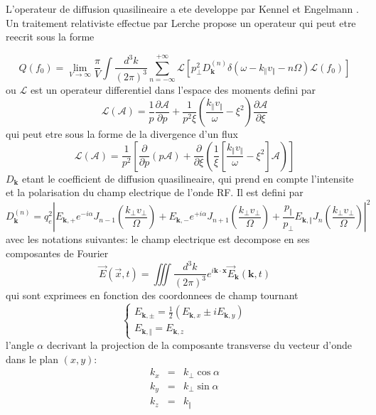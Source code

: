 L'operateur de diffusion quasilineaire a ete developpe par Kennel
et Engelmann . Un traitement relativiste effectue par Lerche propose
un operateur qui peut etre reecrit sous la forme

\[
Q(f_{0})=\lim_{V\rightarrow\infty}\frac{\pi}{V}\int\frac{d^{3}k}{(2\pi)^{3}}\sum_{n=-\infty}^{+\infty}\mathcal{L}\left[p_{\bot}^{2}D_{\mathbf{k}}^{(n)}\delta(\omega-k_{\Vert}v_{\Vert}-n\Omega)\mathcal{L}(f_{0})\right]\]
 ou $\mathcal{L}$ est un operateur differentiel dans l'espace des
moments defini par \[
\mathcal{L}(\mathcal{A})=\frac{1}{p}\frac{\partial\mathcal{A}}{\partial p}+\frac{1}{p^{2}\xi}\left(\frac{k_{\Vert}v_{\Vert}}{\omega}-\xi^{2}\right)\frac{\partial\mathcal{A}}{\partial\xi}\]
 qui peut etre sous la forme de la divergence d'un flux \[
\mathcal{L}(\mathcal{A})=\frac{1}{p^{2}}\left[\frac{\partial}{\partial p}\left(p\mathcal{A}\right)+\frac{\partial}{\partial\xi}\left(\frac{1}{\xi}\left[\frac{k_{\Vert}v_{\Vert}}{\omega}-\xi^{2}\right]\mathcal{A}\right)\right]\]
 $D_{\mathbf{k}}$ etant le coefficient de diffusion quasilineaire,
qui prend en compte l'intensite et la polarisation du champ electrique
de l'onde RF. Il est defini par \[
D_{\mathbf{k}}^{(n)}=q_{e}^{2}\left|E_{\mathbf{k},+}e^{-i\alpha}J_{n-1}\left(\frac{k_{\bot}v_{\bot}}{\Omega}\right)+E_{\mathbf{k},-}e^{+i\alpha}J_{n+1}\left(\frac{k_{\bot}v_{\bot}}{\Omega}\right)+\frac{p_{\Vert}}{p_{\bot}}E_{\mathbf{k},\Vert}J_{n}\left(\frac{k_{\bot}v_{\bot}}{\Omega}\right)\right|^{2}\]
 avec les notations suivantes: le champ electrique est decompose en
ses composantes de Fourier \[
\overrightarrow{E}(\overrightarrow{x},t)=\iiint\frac{d^{3}k}{(2\pi)^{3}}e^{i\mathbf{k}\cdot\mathbf{x}}\overrightarrow{E}_{\mathbf{k}}\left(\mathbf{k},t\right)\]
 qui sont exprimees en fonction des coordonnees de champ tournant
\[
\left\{ \begin{array}{l}
E_{\mathbf{k},\pm}=\frac{1}{2}\left(E_{\mathbf{k},x}\pm iE_{\mathbf{k},y}\right)\\
E_{\mathbf{k},\Vert}=E_{\mathbf{k},z}\end{array}\right.\]
 l'angle $\alpha$ decrivant la projection de la composante transverse
du vecteur d'onde dans le plan $(x,y)$: \begin{eqnarray*}
k_{x} & = & k_{\bot}\cos\alpha\\
k_{y} & = & k_{\bot}\sin\alpha\\
k_{z} & = & k_{\Vert}\end{eqnarray*}


